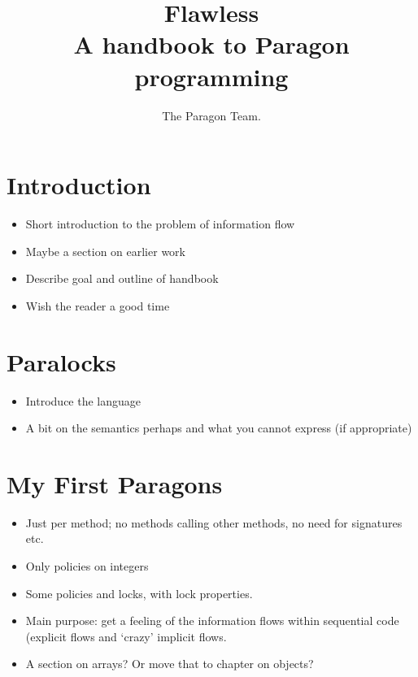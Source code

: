\documentclass{book}
\title{Flawless\\A handbook to Paragon programming}
\author{The Paragon Team.}
\begin{document}
\maketitle

\tableofcontents

\chapter{Introduction}
\label{chap:introduction}

\begin{itemize}

  \item Short introduction to the problem of information flow
  
  \item Maybe a section on earlier work
  
  \item Describe goal and outline of handbook
  
  \item Wish the reader a good time

\end{itemize}

\chapter{Paralocks}
\label{chap:paralocks}

\begin{itemize}

  \item Introduce the language
  
  \item A bit on the semantics perhaps and what you cannot express 
        (if appropriate)

\end{itemize}

\chapter{My First Paragons}
\label{chap:firstParagons}

\begin{itemize}

  \item Just per method; no methods calling other methods, no need for 
         signatures etc.
         
  \item Only policies on integers
  
  \item Some policies and locks, with lock properties.
  
  \item Main purpose: get a feeling of the information flows within 
        sequential code (explicit flows and `crazy' implicit flows.
        
  \item A section on arrays? Or move that to chapter on objects?

\end{itemize}
\end{document}
